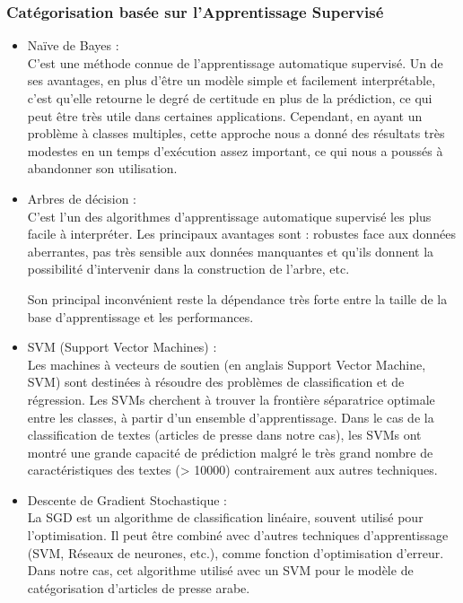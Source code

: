     \subsubsection{Catégorisation basée sur l'Apprentissage Supervisé}
        \begin{itemize}
            \item{Naïve de Bayes : }\\
            C'est une méthode connue de l'apprentissage automatique supervisé. Un de ses avantages, en plus d'être un modèle simple et facilement interprétable, c'est qu'elle retourne le degré de certitude en plus de la prédiction, ce qui peut être très utile dans certaines applications. Cependant, en ayant un problème à classes multiples, cette approche nous a donné des résultats très modestes en un temps d'exécution assez important, ce qui nous a poussés à abandonner son utilisation.\\
            
            \item{Arbres de décision : }\\
            C'est l'un des algorithmes d'apprentissage automatique supervisé les plus facile à interpréter. Les principaux avantages sont : robustes face aux données aberrantes, pas très sensible aux données manquantes et qu'ils donnent la possibilité d'intervenir dans la construction de l'arbre, etc. 

            Son principal inconvénient reste la dépendance très forte entre la taille de la base d'apprentissage et les performances.\\
            
            \item{SVM (Support Vector Machines) : }\\
            Les machines à vecteurs de soutien (en anglais Support Vector Machine, SVM) sont destinées à résoudre des problèmes de classification et de régression. Les SVMs cherchent à trouver la frontière séparatrice optimale entre les classes, à partir d'un ensemble d'apprentissage. Dans le cas de la classification de textes (articles de presse dans notre cas), les SVMs ont montré une grande capacité de prédiction malgré le très grand nombre de caractéristiques des textes (> 10000) contrairement aux autres techniques.\\ 
            
            \item{Descente de Gradient Stochastique : }\\
            La SGD est un algorithme de classification linéaire, souvent utilisé pour l'optimisation. Il peut être combiné avec d'autres techniques d'apprentissage (SVM, Réseaux de neurones, etc.), comme  fonction d'optimisation d'erreur. Dans notre cas, cet algorithme utilisé avec un SVM pour le modèle de catégorisation d'articles de presse arabe.
        \end{itemize}

